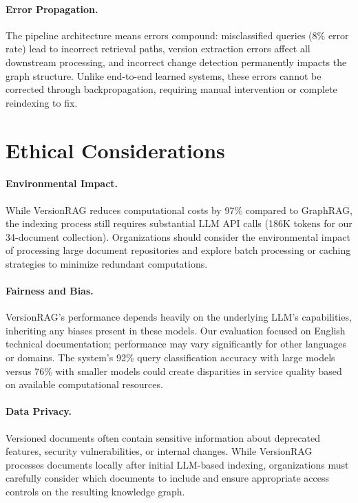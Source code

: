 \documentclass[11pt]{article}
\begin{document}
\paragraph{Error Propagation.}
The pipeline architecture means errors compound: misclassified queries (8\% error rate) lead to incorrect retrieval paths, version extraction errors affect all downstream processing, and incorrect change detection permanently impacts the graph structure. Unlike end-to-end learned systems, these errors cannot be corrected through backpropagation, requiring manual intervention or complete reindexing to fix.

\section*{Ethical Considerations}

\paragraph{Environmental Impact.}
While VersionRAG reduces computational costs by 97\% compared to GraphRAG, the indexing process still requires substantial LLM API calls (186K tokens for our 34-document collection). Organizations should consider the environmental impact of processing large document repositories and explore batch processing or caching strategies to minimize redundant computations.

\paragraph{Fairness and Bias.}
VersionRAG's performance depends heavily on the underlying LLM's capabilities, inheriting any biases present in these models. Our evaluation focused on English technical documentation; performance may vary significantly for other languages or domains. The system's 92\% query classification accuracy with large models versus 76\% with smaller models could create disparities in service quality based on available computational resources.

\paragraph{Data Privacy.}
Versioned documents often contain sensitive information about deprecated features, security vulnerabilities, or internal changes. While VersionRAG processes documents locally after initial LLM-based indexing, organizations must carefully consider which documents to include and ensure appropriate access controls on the resulting knowledge graph.
\end{document}
